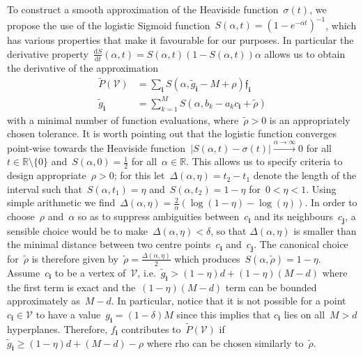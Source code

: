 \documentclass[letterpaper, 10pt, conference]{ieeeconf} %
\providecommand{\abs}[1]{\left\lvert#1\right\rvert}
\providecommand{\bfa}[1]{\mathbf{#1}}
\begin{document}
%
To construct a smooth approximation of the Heaviside function~$\sigma(t)$,
we propose the use of the logistic Sigmoid function~$S(\alpha,t) = (1-e^{-\alpha t})^{-1}$, which has various properties that make it favourable for our purposes.
%
In particular the derivative property~$\frac{\mathrm d S}{\mathrm d t}(\alpha,t)=S(\alpha,t)(1-S(\alpha,t))\alpha$ allows us to obtain the derivative of the approximation
%
\begin{equation}\label{eq:central:approximation:formula}
\begin{aligned}
\tilde{P}(\mathcal V) &= \sum_\bfa{i}S(\alpha,\tilde g_\bfa{i}-M+\rho)\mathfrak f_\bfa{i}\\
\tilde g_\bfa{i} &= \sum_{k=1}^M S(\alpha,b_k-a_k c_\bfa{i}+\tilde\rho)
\end{aligned}
\end{equation}
%
with a minimal number of function evaluations, where~$\tilde\rho>0$ is an appropriately chosen tolerance.
%
It is worth pointing out that the logistic function converges point-wise towards the Heaviside function~$\abs{S(\alpha,t)-\sigma(t)}\xrightarrow{\alpha\rightarrow\infty}0$ for all~$t\in\mathbb R\setminus\{0\}$ and~$S(\alpha,0)=\frac{1}{2}$ for all~$\alpha\in\mathbb R$.
%
This allows us to specify criteria to design appropriate~$\rho>0$; for this let~$\Delta(\alpha,\eta)=t_2-t_1$ denote the length of the interval such that~$S(\alpha,t_1)=\eta$ and~$S(\alpha,t_2)=1-\eta$ for~$0<\eta<1$.
%
Using simple arithmetic we find~$\Delta(\alpha,\eta)=\frac{2}{\alpha}(\log(1-\eta)-\log(\eta))$. In order to choose~$\rho$ and~$\alpha$ so as to suppress ambiguities between~$c_\bfa{i}$ and its neighbours~$c_\bfa{j}$, a sensible choice would be to make~$\Delta(\alpha,\eta)<\delta$, so that $\Delta(\alpha,\eta)$ is smaller than the minimal distance between two centre points~$c_\bfa{i}$ and~$c_\bfa{j}$. 
%
The canonical choice for~$\tilde\rho$ is therefore given by~$\tilde\rho=\frac{\Delta(\alpha,\eta)}{2}$ which produces~$S(\alpha,\tilde\rho)=1-\eta$.
%
Assume~$c_\bfa{i}$ to be a vertex of~$\mathcal V$, i.e.~$\tilde g_\bfa{i}>(1-\eta)d+(1-\eta)(M-d)$ where the first term is exact and the~$(1-\eta)(M-d)$ term can be bounded approximately as~$M-d$.
%
In particular, notice that it is not possible for a point~$c_\bfa{i}\in\mathcal V$ to have a value~$g_\bfa{i}=(1-\delta)M$ since this implies that $c_\bfa{i}$ lies on all~$M>d$ hyperplanes.
%
Therefore, $f_\bfa{i}$ contributes to~$\tilde{P}(\mathcal V)$ if~$\tilde g_\bfa{i}\geq(1-\eta)d+(M-d)-\rho$ where rho can be chosen similarly to~$\tilde\rho$.
\end{document}
